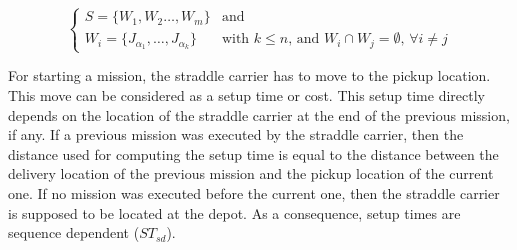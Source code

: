 \documentclass[a4paper,12pt]{article}
\begin{document}
\begin{equation*}
\begin{cases}
 S = \{ W_{1} , W_{2} \ldots , W_{m}\} & \text{and}\\
 W_{i} = \{ J_{\alpha_1} , \ldots , J_{\alpha_k} \} & \text{with $k \leq n$, and $W_{i} \cap W_{j} = \emptyset$,  $\forall i \neq j$} 
\end{cases}
\end{equation*}
 


For starting a mission, the straddle carrier has to move to the pickup location. This move can be considered as a setup time or cost. This setup time directly depends on the location of the straddle carrier at the end of the previous mission, if any. If a previous mission was executed by the straddle carrier, then the distance used for computing the setup time is equal to the distance between the delivery location of the previous mission and the pickup location of the current one. If no mission was executed before the current one, then the straddle carrier is supposed to be located at the depot. As a consequence, setup times are sequence dependent ($ST_{sd}$). 
\end{document}
